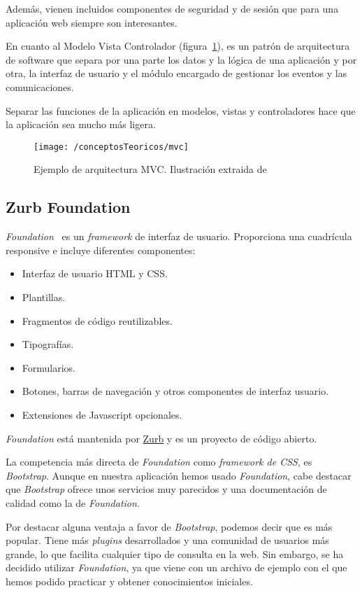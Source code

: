 Además, vienen incluidos componentes de seguridad y de sesión que para una aplicación web siempre son interesantes.

En cuanto al Modelo Vista Controlador (figura~\ref{fig:mvc}), es un patrón de arquitectura de software que separa por una parte los datos y la lógica de una aplicación y por otra, la interfaz de usuario y el módulo encargado de gestionar los eventos y las comunicaciones. 

Separar las funciones de la aplicación en modelos, vistas y controladores hace que la aplicación sea mucho más ligera.

\begin{figure}[ht]
	\centering
	\texttt{[image: /conceptosTeoricos/mvc]}
	\caption{Ejemplo de arquitectura MVC. Ilustración extraida de~\cite{img:MVC}}
	\label{fig:mvc}
\end{figure}

\subsection{Zurb Foundation}

\textit{Foundation}~\cite{web:foundation} es un \textit{framework} de interfaz de usuario. Proporciona una cuadrícula responsive e incluye diferentes componentes:
\begin{itemize}
	\item Interfaz de usuario HTML y CSS.
	\item Plantillas.
	\item Fragmentos de código reutilizables.
	\item Tipografías.
	\item Formularios.
	\item Botones, barras de navegación y otros componentes de interfaz usuario.
	\item Extensiones de Javascript opcionales.
\end{itemize}

\textit{Foundation} está mantenida por \href{zurb.com}{Zurb} y es un proyecto de código abierto.

La competencia más directa de \textit{Foundation} como \textit{framework de CSS}, es \textit{Bootstrap}. Aunque en nuestra aplicación hemos usado \textit{Foundation}, cabe destacar que \textit{Bootstrap} ofrece unos servicios muy parecidos y una documentación de calidad como la de \textit{Foundation}. 

Por destacar alguna ventaja a favor de \textit{Bootstrap}, podemos decir que es más popular. Tiene más \textit{plugins} desarrollados y una comunidad de usuarios más grande, lo que facilita cualquier tipo de consulta en la web. Sin embargo, se ha decidido utilizar \textit{Foundation}, ya que viene con un archivo de ejemplo con el que hemos podido practicar y obtener conocimientos iniciales.
